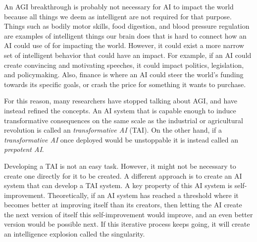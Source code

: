 \documentclass[12pt,A4]{report}
\theoremstyle{definition}
\begin{document}
An AGI breakthrough is probably not necessary for AI to impact the world because all things we deem as intelligent are not required for that purpose. Things such as bodily motor skills, food digestion, and blood pressure regulation are examples of intelligent things our brain does that is hard to connect how an AI could use of for impacting the world. However, it could exist a more narrow set of intelligent behavior that could have an impact. For example, if an AI could create convincing and motivating speeches, it could impact politics, legislation, and policymaking. Also, finance is where an AI could steer the world's funding towards its specific goals, or crash the price for something it wants to purchase. 

For this reason, many researchers have stopped talking about AGI, and have instead refined the concepts\autocite{Critch Kruger}. An AI system that is capable enough to induce transformative consequences on the same scale as the industrial or agricultural revolution is called an \textit{transformative AI} (TAI). On the other hand, if a \textit{transformative AI} once deployed would be unstoppable it is instead called an \textit{prepotent AI}. 

Developing a TAI is not an easy task. However, it might not be necessary to create one directly for it to be created\autocite{Superintelligence}. A different approach is to create an AI system that can develop a TAI system. A key property of this AI system is self-improvement. Theoretically, if an AI system has reached a threshold where it becomes better at improving itself than its creators, then letting the AI create the next version of itself this self-improvement would improve, and an even better version would be possible next. If this iterative process keeps going, it will create an intelligence explosion called the singularity\autocite{Yudkowsky}.  
\end{document}
